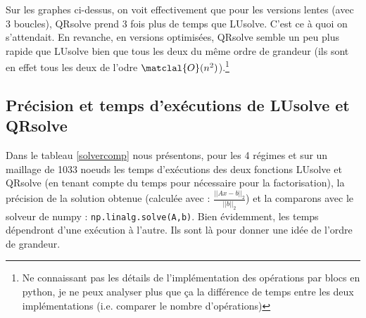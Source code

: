 \documentclass[11pt]{article}
\begin{document}
Sur les graphes ci-dessus, on voit effectivement que pour les versions lentes (avec 3 boucles), QRsolve prend 3 fois plus de temps que LUsolve. C'est ce à quoi on s'attendait. En revanche, en versions optimisées, QRsolve semble un peu plus rapide que LUsolve bien que tous les deux du même ordre de grandeur (ils sont en effet tous les deux de l'odre $\matclal{O}(n^2)$).\footnote{Ne connaissant pas les détails de l'implémentation des opérations par blocs en python, je ne peux analyser plus que ça la différence de temps entre les deux implémentations (i.e. comparer le nombre d'opérations)}

\vspace{-10pt}
\subsection{Précision et temps d'exécutions de LUsolve et QRsolve}
\vspace{-8pt}
Dans le tableau \ref{solvercomp} nous présentons, pour les 4 régimes et sur un maillage de 1033 noeuds les temps d'exécutions des deux fonctions LUsolve et QRsolve (en tenant compte du temps pour nécessaire pour la factorisation), la précision de la solution obtenue (calculée avec : $\frac{||Ax-b||_2}{ ||b||_2}$) et la comparons avec le solveur de numpy : \texttt{np.linalg.solve(A,b)}. Bien évidemment, les temps dépendront d'une exécution à l'autre. Ils sont là pour donner une idée de l'ordre de grandeur. 
\end{document}

